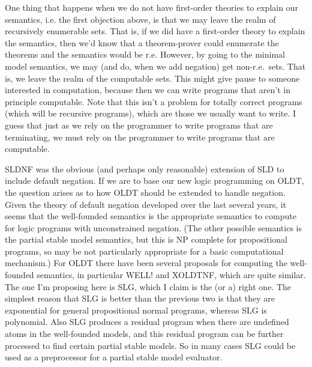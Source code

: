 One thing that happens when we do not have first-order theories to
explain our semantics, i.e. the first objection above, is that we may
leave the realm of recursively enumerable sets.  That is, if we did have a first-order
theory to explain the semantics, then we'd know that a theorem-prover
could enumerate the theorems and the semantics would be r.e.  However,
by going to the minimal model semantics, we may (and do, when we add
negation) get non-r.e.~sets.  That is, we leave the realm of the
computable sets.  This might give pause to someone interested in
computation, because then we can write programs that aren't in
principle computable.  Note that this isn't a problem for totally
correct programs (which will be recursive programs), which are those
we usually want to write.  I guess that just as we rely on the
programmer to write programs that are terminating, we must rely on the
programmer to write programs that are computable.

SLDNF was the obvious (and perhaps only reasonable) extension of SLD
to include default negation.  If we are to base our new logic
programming on OLDT, the question arises as to how OLDT should be
extended to handle negation.  Given the theory of default negation
developed over the last several years, it seems that the well-founded
semantics is the appropriate semantics to compute for logic programs
with unconstrained negation.  (The other possible semantics is the
partial stable model semantics, but this is NP complete for
propositional programs, so may be not particularly appropriate for a
basic computational mechanism.)  For OLDT there have been several
proposals for computing the well-founded semantics, in particular
WELL! and XOLDTNF, which are quite similar.  The one I'm proposing
here is SLG, which I claim is the (or a) right one.  The simplest
reason that SLG is better than the previous two is that they are
exponential for general propositional normal programs, whereas SLG is
polynomial.  Also SLG produces a residual program when there are
undefined atoms in the well-founded models, and this residual program
can be further processed to find certain partial stable models.  So in
many cases SLG could be used as a preprocessor for a partial stable
model evaluator.

